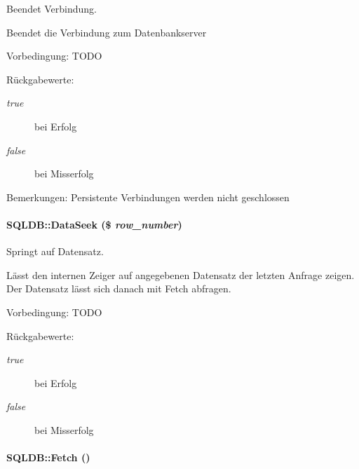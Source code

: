 Beendet Verbindung. 

Beendet die Verbindung zum Datenbankserver \begin{Desc}
\item[Vorbedingung:]TODO \end{Desc}
\begin{Desc}
\item[R\"{u}ckgabewerte:]
\begin{description}
\item[{\em true}]bei Erfolg \item[{\em false}]bei Misserfolg \end{description}
\end{Desc}
\begin{Desc}
\item[Bemerkungen:]Persistente Verbindungen werden nicht geschlossen \end{Desc}
\hypertarget{classSQLDB_0766b746a81684e014c235db35818e54}{
\paragraph[DataSeek]{\setlength{\rightskip}{0pt plus 5cm}SQLDB::Data\-Seek (\$ {\em row\_\-number})}\hfill}
\label{classSQLDB_0766b746a81684e014c235db35818e54}


Springt auf Datensatz. 

Lässt den internen Zeiger auf angegebenen Datensatz der letzten Anfrage zeigen. Der Datensatz lässt sich danach mit Fetch abfragen. \begin{Desc}
\item[Vorbedingung:]TODO \end{Desc}
\begin{Desc}
\item[R\"{u}ckgabewerte:]
\begin{description}
\item[{\em true}]bei Erfolg \item[{\em false}]bei Misserfolg \end{description}
\end{Desc}
\hypertarget{classSQLDB_a55c00ce1de0e50e0a58cae61892ba35}{
\paragraph[Fetch]{\setlength{\rightskip}{0pt plus 5cm}SQLDB::Fetch ()}\hfill}
\label{classSQLDB_a55c00ce1de0e50e0a58cae61892ba35}


